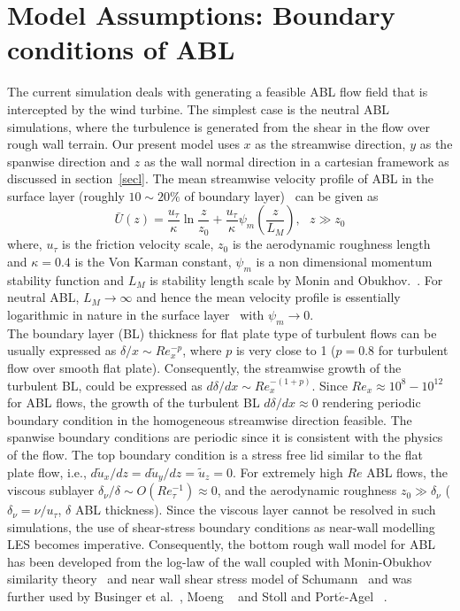 \section{Model Assumptions: Boundary conditions of ABL}\label{ablBC}
The current simulation deals with generating a feasible ABL flow field that is intercepted by the wind turbine. The simplest case is the neutral ABL simulations, where the turbulence is generated from the shear in the flow over rough wall terrain. Our present model uses $x$ as the streamwise direction, $y$ as the spanwise direction and $z$ as the wall normal direction in a cartesian framework as discussed in section~\ref{secl}. The mean streamwise velocity profile of ABL  in the surface layer (roughly $10 \sim 20\%$ of boundary layer)~\cite{basin,porte1fun,brass,meyers} can be given as
\begin{equation}
\bar{U}(z) = \frac{u_{\tau}}{\kappa}\ln \frac{z}{z_0} + \frac{u_{\tau}}{\kappa}\psi_m(\frac{z}{L_M}),\ \ \  z \gg z_0  \label{logvel}
\end{equation}
where, $u_\tau$ is the friction velocity scale, $z_0$ is the aerodynamic roughness length and $\kappa = 0.4$ is the Von Karman constant, $\psi_m$ is a non dimensional momentum stability function and $L_M$ is stability length scale by Monin and Obukhov.~\cite{obu,basin}. For neutral ABL, $L_M\rightarrow \infty$ and hence the mean velocity profile is essentially logarithmic in nature in the surface layer~\cite{obu} with $\psi_m \rightarrow 0$.\\
The boundary layer (BL) thickness for flat plate type of turbulent flows can be usually expressed as $\delta/x \sim Re_{x}^{-p}$, where $p$ is very close to 1 ($p = 0.8$ for turbulent flow over smooth flat plate)\cite{schlichting}. Consequently, the streamwise growth of the turbulent BL, could be expressed as $d\delta/dx \sim Re_{x}^{-(1+p)} $.
Since $Re_x \approx 10^8-10^{12}$ for ABL flows, the growth of the turbulent BL $d\delta/dx \approx 0$ rendering periodic boundary condition in the homogeneous streamwise direction feasible. The spanwise boundary conditions are periodic since it is consistent with the physics of the flow. The top boundary condition is a stress free lid similar to the flat plate flow, i.e., $d{\tilde{u}}_{x}/dz = d{\tilde{u}}_{y}/dz = {\tilde{u}}_{z} = 0$. For extremely high $Re$ ABL flows, the viscous sublayer $\delta_\nu/\delta \sim O(Re_{\tau}^{-1}) \approx 0$, and the aerodynamic roughness $z_0 \gg \delta_\nu$ ($\delta_{\nu} = \nu/u_{\tau}$, $\delta$ ABL thickness). Since the viscous layer cannot be resolved in such simulations, the use of shear-stress boundary conditions as near-wall modelling LES becomes imperative. Consequently, the bottom rough wall model for ABL has been developed from the log-law of the wall coupled with Monin-Obukhov similarity theory~\cite{obu} and near wall shear stress model of Schumann~\cite{schumann} and was further used by Businger et al.~\cite{basin}, Moeng ~\cite{moeng1} and Stoll and Port$\acute{e}$-Agel ~\cite{porte1a}.
